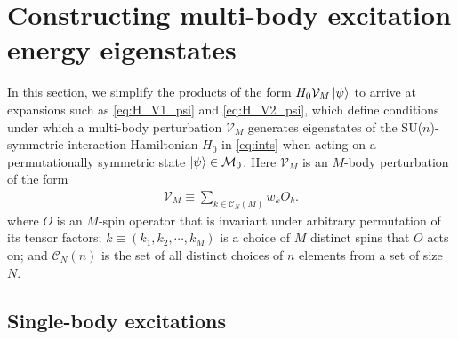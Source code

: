 \documentclass[nofootinbib,notitlepage,11pt]{revtex4-2}
\newcommand{\p}[1]{\left(#1\right)} %
\newcommand{\1}{\mathds{1}}
\newcommand{\C}{\mathcal{C}}
\newcommand{\M}{\mathcal{M}}
\newcommand{\V}{\mathcal{V}}
\begin{document}
\section{Constructing multi-body excitation energy eigenstates}
\label{sec:H_VM_psi}

In this section, we simplify the products of the form
$H_0\V_M\ket\psi$ to arrive at expansions such as \eqref{eq:H_V1_psi}
and \eqref{eq:H_V2_psi}, which define conditions under which a
multi-body perturbation $\V_M$ generates eigenstates of the
SU($n$)-symmetric interaction Hamiltonian $H_0$ in \eqref{eq:ints}
when acting on a permutationally symmetric state $\ket\psi\in\M_0$.
Here $\V_M$ is an $M$-body perturbation of the form
\begin{align}
  \V_M \equiv \sum_{k\in\C_N\p{M}} w_k O_k.
\end{align}
where $O$ is an $M$-spin operator that is invariant under arbitrary
permutation of its tensor factors; $k\equiv\p{k_1,k_2,\cdots,k_M}$ is
a choice of $M$ distinct spins that $O$ acts on; and $\C_N\p{n}$ is
the set of all distinct choices of $n$ elements from a set of size
$N$.

\subsection{Single-body excitations}
\label{sec:H_V1_psi}
\end{document}
